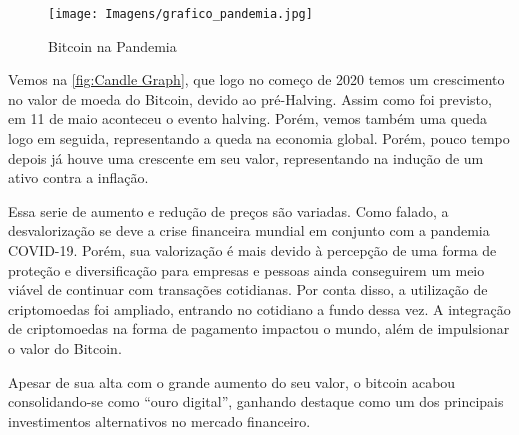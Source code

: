 
\begin{figure}
    \centering
    \texttt{[image: Imagens/grafico\_pandemia.jpg]}
    \caption{Bitcoin na Pandemia}
    \label{fig:pandemia}
\end{figure}

Vemos na \cref{fig:Candle Graph}, que logo no começo de 2020 temos um crescimento no valor de moeda do Bitcoin, devido ao pré-Halving. Assim como foi previsto, em 11 de maio aconteceu o evento halving. Porém, vemos também uma queda logo em seguida, representando a queda na economia global. Porém, pouco tempo depois já houve uma crescente em seu valor, representando na indução de um ativo contra a inflação.

Essa serie de aumento e redução de preços são variadas. Como falado, a desvalorização se deve a crise financeira mundial em conjunto com a pandemia COVID-19. Porém, sua valorização é mais devido à percepção de uma forma de proteção e diversificação para empresas e pessoas ainda conseguirem um meio viável de continuar com transações cotidianas. Por conta disso, a utilização de criptomoedas foi ampliado, entrando no cotidiano a fundo dessa vez. A integração de criptomoedas na forma de pagamento impactou o mundo, além de impulsionar o valor do Bitcoin.

Apesar de sua alta com o grande aumento do seu valor, o bitcoin acabou consolidando-se como “ouro digital”, ganhando destaque como um dos principais investimentos alternativos no mercado financeiro.